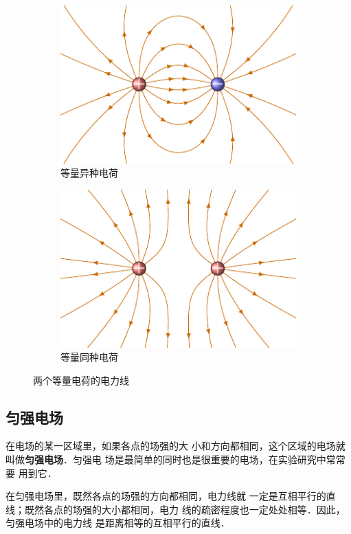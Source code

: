 \begin{figure}[htbp]
    \centering
    \begin{subfigure}{0.4\linewidth}
        \centering
        \includegraphics{fig/B/6-10a.pdf}
        \caption{等量异种电荷}\label{fig_B_6-10a}
    \end{subfigure}
    \hfil
    \begin{subfigure}{0.4\linewidth}
        \centering
        \includegraphics{fig/B/6-10b.pdf}
        \caption{等量同种电荷}\label{fig_B_6-10b}
    \end{subfigure}
    \caption{两个等量电荷的电力线}\label{fig_B_6-10}
\end{figure}
    


\subsection{匀强电场} 

在电场的某一区域里，如果各点的场强的大
小和方向都相同，这个区域的电场就叫做\textbf{匀强电场}．匀强电
场是最简单的同时也是很重要的电场，在实验研究中常常要
用到它．

在匀强电场里，既然各点的场强的方向都相同，电力线就
一定是互相平行的直线；既然各点的场强的大小都相同，电力
线的疏密程度也一定处处相等．因此，匀强电场中的电力线
是距离相等的互相平行的直线．

